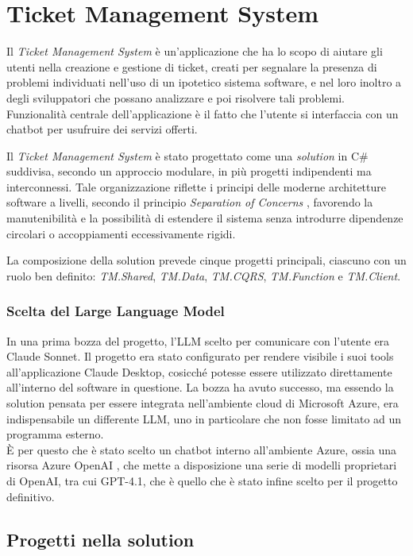 \chapter{Ticket Management System}

Il \textit{Ticket Management System} è un'applicazione che ha lo scopo di aiutare gli utenti nella creazione e gestione di ticket,
creati per segnalare la presenza di problemi individuati nell'uso di un ipotetico sistema software, e nel loro inoltro a degli sviluppatori
che possano analizzare e poi risolvere tali problemi. Funzionalità centrale dell'applicazione è il fatto che l'utente si interfaccia con un chatbot
per usufruire dei servizi offerti.

Il \textit{Ticket Management System} è stato progettato come una \textit{solution} in C\# suddivisa, secondo un approccio modulare,
in più progetti indipendenti ma interconnessi. Tale organizzazione riflette i principi delle moderne architetture software a livelli,
secondo il principio \textit{Separation of Concerns} \cite{msdn2009separation}, favorendo la manutenibilità e la possibilità di estendere il sistema
senza introdurre dipendenze circolari o accoppiamenti eccessivamente rigidi.

La composizione della solution prevede cinque progetti principali, ciascuno con un ruolo ben definito: \textit{TM.Shared}, \textit{TM.Data},
\textit{TM.CQRS}, \textit{TM.Function} e \textit{TM.Client}.

\subsection{Scelta del Large Language Model}
In una prima bozza del progetto, l'LLM scelto per comunicare con l'utente era Claude Sonnet. Il progetto era stato configurato per rendere visibile i suoi
tools all'applicazione Claude Desktop, cosicché potesse essere utilizzato direttamente all'interno del software in questione. La bozza ha avuto successo, ma
essendo la solution pensata per essere integrata nell'ambiente cloud di Microsoft Azure, era indispensabile un differente LLM, uno in particolare che non fosse
limitato ad un programma esterno. \\
È per questo che è stato scelto un chatbot interno all'ambiente Azure, ossia una risorsa Azure OpenAI \cite{azure_openai_foundry}, che mette a disposizione
una serie di modelli proprietari di OpenAI, tra cui GPT-4.1, che è quello che è stato infine scelto per il progetto definitivo.

\newpage
\section{Progetti nella solution}

